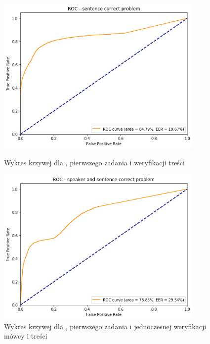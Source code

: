 \begin{figure}[H]
    \centering
    \begin{minipage}{.5\textwidth}
        \centering
        \includegraphics[width=0.9\textwidth]{images/4_3_dnn_roc_sentence}
        \caption{Wykres krzywej  dla , pierwszego zadania  i weryfikacji treści}
        \label{fig:4_3_dnn_roc_sentence}
    \end{minipage}%
    \begin{minipage}{.5\textwidth}
        \centering
        \includegraphics[width=0.9\textwidth]{images/4_3_dnn_roc_both}
        \caption{Wykres krzywej  dla , pierwszego zadania  i jednoczesnej weryfikacji mówcy i treści}
        \label{fig:4_3_dnn_roc_both}
    \end{minipage}
\end{figure}

